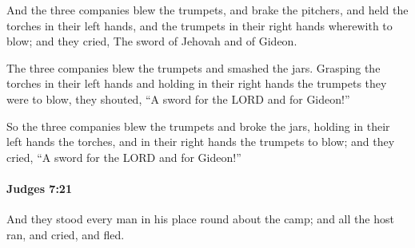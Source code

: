 			\begin{versebox}
					\item[BHS] 
					\item[ASV] And the three companies blew the trumpets, and brake the pitchers, and held the torches in their left hands, and the trumpets in their right hands wherewith to blow; and they cried, The sword of Jehovah and of Gideon.
					\item[NIV] The three companies blew the trumpets and smashed the jars. Grasping the torches in their left hands and holding in their right hands the trumpets they were to blow, they shouted, “A sword for the LORD and for Gideon!”
					\item[NRSV] So the three companies blew the trumpets and broke the jars, holding in their left hands the torches, and in their right hands the trumpets to blow; and they cried, “A sword for the LORD and for Gideon!”
			\end{versebox}

		\paragraph{Judges 7:21} %
			\label{JUDGES-7-21}

			And they stood every man in his place round about the camp; and all the host ran, and cried, and fled.

